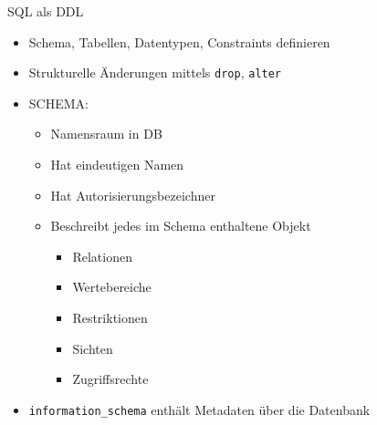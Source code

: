 \documentclass{article}
\begin{document}
\begin{block}{SQL als DDL}
  \begin{itemize}
    \item Schema, Tabellen, Datentypen, Constraints definieren
    \item Strukturelle Änderungen mittels \texttt{drop}, \texttt{alter}
    \item SCHEMA:
    \begin{itemize}
      \item Namensraum in DB
      \item Hat eindeutigen Namen
      \item Hat Autorisierungsbezeichner
      \item Beschreibt jedes im Schema enthaltene Objekt
      \begin{itemize}
        \item Relationen
        \item Wertebereiche
        \item Restriktionen
        \item Sichten
        \item Zugriffsrechte
      \end{itemize}
    \end{itemize}
    \item \texttt{information\_schema} enthält Metadaten über die Datenbank
  \end{itemize}
\end{block}
\end{document}
